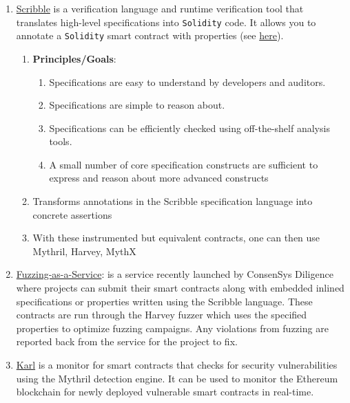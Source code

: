 \begin{enumerate}
\item\href{https://github.com/consensys/scribble}{Scribble} is a verification language and runtime verification tool that translates high-level specifications into \verb|Solidity| code. It allows you to annotate a \verb|Solidity| smart contract with properties (see \href{https://docs.scribble.codes/}{here}).
	\begin{enumerate}
	\item\textbf{Principles/Goals}:
        \begin{enumerate}
        \item Specifications are easy to understand by developers and auditors.
        \item Specifications are simple to reason about.
        \item Specifications can be efficiently checked using off-the-shelf analysis tools.
        \item A small number of core specification constructs are sufficient to express and reason about more advanced constructs
        \end{enumerate}
	\item Transforms annotations in the Scribble specification language into concrete assertions
	\item With these instrumented but equivalent contracts, one can then use Mythril, Harvey, MythX
	\end{enumerate}

\item\href{https://consensys.net/diligence/fuzzing/}{Fuzzing-as-a-Service}: is a service recently launched by ConsenSys Diligence where projects can submit their smart contracts along with embedded inlined specifications or properties written using the Scribble language. These contracts are run through the Harvey fuzzer which uses the specified properties to optimize fuzzing campaigns. Any violations from fuzzing are reported back from the service for the project to fix.

\item\href{https://github.com/cleanunicorn/karl}{Karl} is a monitor for smart contracts that checks for security vulnerabilities using the Mythril detection engine. It can be used to monitor the Ethereum blockchain for newly deployed vulnerable smart contracts in real-time.


\end{enumerate}
